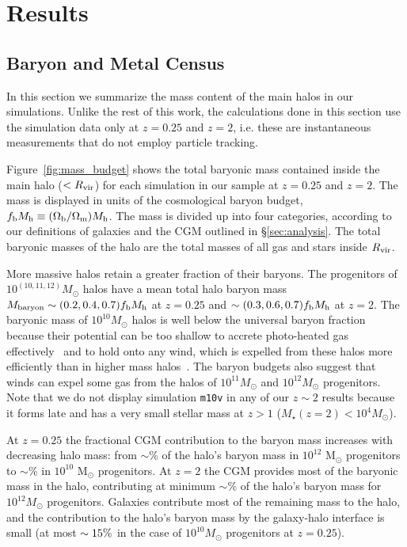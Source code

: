 \documentclass[fleqn,usenatbib]{mnras}
\begin{document}
\section{Results}

\subsection{Baryon and Metal Census}
\label{sec:mass_budgets}

In this section we summarize the mass content of the main halos in our simulations.
Unlike the rest of this work, the calculations done in this section use the simulation data only at $z=0.25$ and $z=2$, i.e. these are instantaneous measurements that do not employ particle tracking.
   
Figure~\ref{fig:mass_budget} shows the total baryonic mass contained inside the main halo ($<R_{\rm vir}$) for each simulation in our sample at $z=0.25$ and $z=2$. 
The mass is displayed in units of the cosmological baryon budget, $f_{\rm b} M_{\rm h} \equiv ( \Omega_{\rm b} / \Omega_{\rm m} ) M_{\rm h}$.
The mass is divided up into four categories, according to our definitions of galaxies and the CGM outlined in \S\ref{sec:analysis}.
The total baryonic masses of the halo are the total masses of all gas and stars inside $R_{\rm vir}$. 

More massive halos retain a greater fraction of their baryons. 
The progenitors of $10^{(10,11,12)} M_\odot$ halos have a mean total halo baryon mass $M_{\rm baryon} \sim(0.2,0.4,0.7) f_{\rm b} M_{\rm h}$ at $z=0.25$ and  $\sim(0.3,0.6,0.7)f_{\rm b} M_{\rm h}$ at $z=2$.
The baryonic mass of $10^{10} M_\odot$ halos is well below the universal baryon fraction because their potential can be too shallow to accrete photo-heated gas effectively~\citep[e.g.][]{Thoul1996, Gnedin2000, Okamoto2008, Faucher-Giguere2011,El-Badry2017} and to hold onto any wind, which is expelled from these halos more efficiently than in higher mass halos~\citep[e.g.][]{Muratov2015}.
The baryon budgets also suggest that winds can expel some gas from the halos of $10^{11} M_\odot$ and $10^{12} M_\odot$ progenitors.
Note that we do not display simulation \texttt{m10v} in any of our $z\sim2$ results because it forms late and has a very small stellar mass at $z>1$ ($M_\star (z=2) < 10^4 M_\odot$).

At $z=0.25$ the fractional CGM contribution to the baryon mass increases with decreasing halo mass: from $\sim$\fCGMMWmeanlow\% of the halo's baryon mass in $10^{12}$ M$_\odot$ progenitors to $\sim$\fCGMdwarfmeanlow\% in $10^{10}$ M$_\odot$ progenitors.
At $z=2$ the CGM provides most of the baryonic mass in the halo, contributing at minimum $\sim$\fCGMMWmeanhigh\% of the halo's baryon mass for $10^{12} M_\odot$ progenitors.
Galaxies contribute most of the remaining mass to the halo, and the contribution to the halo's baryon mass by the galaxy-halo interface is small (at most $\sim15\%$ in the case of $10^{10} M_\odot$ progenitors at $z=0.25$).
\end{document}
